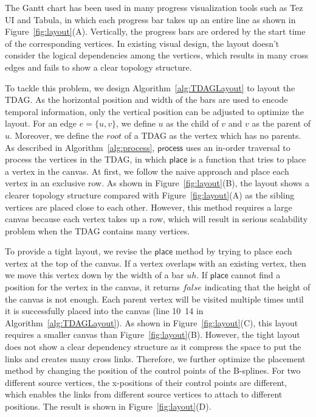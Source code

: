 %


The Gantt chart has been used in many progress visualization tools such as Tez UI and Tabula, in which each progress bar takes up an entire line as shown in Figure~\ref{fig:layout}(A). Vertically, the progress bars are ordered by the start time of the corresponding vertices. In existing visual design, the layout doesn't consider the logical dependencies among the vertices, which results in many cross edges and fails to show a clear topology structure.


To tackle this problem, we design Algorithm~\ref{alg:TDAGLayout} to layout the TDAG. As the horizontal position and width of the bars are used to encode temporal information, only the vertical position can be adjusted to optimize the layout. For an edge $e=\{u,v\}$, we define $u$ as the child of $v$ and $v$ as the parent of $u$. Moreover, we define the $root$ of a TDAG as the vertex which has no parents. As described in Algorithm~\ref{alg:process}, $\mathsf{process}$ uses an in-order traversal to process the vertices in the TDAG, in which $\mathsf{place}$ is a function that tries to place a vertex in the canvas. At first, we follow the naive approach and place each vertex in an exclusive row. As shown in Figure~\ref{fig:layout}(B), the layout shows a clearer topology structure compared with Figure~\ref{fig:layout}(A) as the sibling vertices are placed close to each other. However, this method requires a large canvas because each vertex takes up a row, which will result in serious scalability problem when the TDAG contains many vertices.  

To provide a tight layout, we revise the $\mathsf{place}$ method by trying to place each vertex at the top of the canvas. If a vertex overlaps with an existing vertex, then we move this vertex down by the width of a bar $uh$. If $\mathsf{place}$ cannot find a position for the vertex in the canvas, it returns $false$ indicating that the height of the canvas is not enough. Each parent vertex will be visited multiple times until it is successfully placed into the canvas (line 10~14 in Algorithm~\ref{alg:TDAGLayout}). As shown in Figure~\ref{fig:layout}(C), this layout requires a smaller canvas than Figure~\ref{fig:layout}(B). However, the tight layout does not show a clear dependency structure as it compress the space to put the links and creates many cross links. Therefore, we further optimize the placement method by  changing the position of the control points of the B-splines. For two different source vertices, the x-positions of their control points are different, which enables the links from different source vertices to attach to different positions. The result is shown in Figure~\ref{fig:layout}(D).

